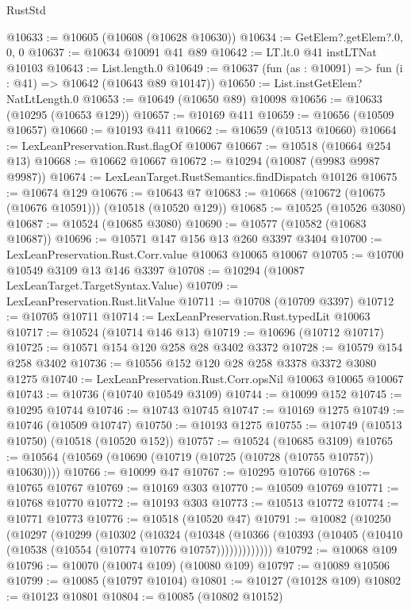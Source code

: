 \begin{lexlean}{RustStd}
\begin{coremodule}
@10633 := @10605 (@10608 (@10628 @10630))
@10634 := GetElem?.getElem?.{0, 0, 0}
@10637 := @10634 @10091 @41 @89
@10642 := LT.lt.{0} @41 instLTNat @10103
@10643 := List.length.{0}
@10649 := @10637 (fun (as : @10091) => fun (i : @41) => @10642 (@10643 @89 @10147))
@10650 := List.instGetElem?NatLtLength.{0}
@10653 := @10649 (@10650 @89) @10098
@10656 := @10633 (@10295 (@10653 @129))
@10657 := @10169 @411
@10659 := @10656 (@10509 @10657)
@10660 := @10193 @411
@10662 := @10659 (@10513 @10660)
@10664 := LexLeanPreservation.Rust.flagOf @10067
@10667 := @10518 (@10664 @254 @13)
@10668 := @10662 @10667
@10672 := @10294 (@10087 (@9983 @9987 @9987))
@10674 := LexLeanTarget.RustSemantics.findDispatch @10126
@10675 := @10674 @129
@10676 := @10643 @7
@10683 := @10668 (@10672 (@10675 (@10676 @10591))) (@10518 (@10520 @129))
@10685 := @10525 (@10526 @3080)
@10687 := @10524 (@10685 @3080)
@10690 := @10577 (@10582 (@10683 @10687))
@10696 := @10571 @147 @156 @13 @260 @3397 @3404
@10700 := LexLeanPreservation.Rust.Corr.value @10063 @10065 @10067
@10705 := @10700 @10549 @3109 @13 @146 @3397
@10708 := @10294 (@10087 LexLeanTarget.TargetSyntax.Value)
@10709 := LexLeanPreservation.Rust.litValue
@10711 := @10708 (@10709 @3397)
@10712 := @10705 @10711
@10714 := LexLeanPreservation.Rust.typedLit @10063
@10717 := @10524 (@10714 @146 @13)
@10719 := @10696 (@10712 @10717)
@10725 := @10571 @154 @120 @258 @28 @3402 @3372
@10728 := @10579 @154 @258 @3402
@10736 := @10556 @152 @120 @28 @258 @3378 @3372 @3080 @1275
@10740 := LexLeanPreservation.Rust.Corr.opsNil @10063 @10065 @10067
@10743 := @10736 (@10740 @10549 @3109)
@10744 := @10099 @152
@10745 := @10295 @10744
@10746 := @10743 @10745
@10747 := @10169 @1275
@10749 := @10746 (@10509 @10747)
@10750 := @10193 @1275
@10755 := @10749 (@10513 @10750) (@10518 (@10520 @152))
@10757 := @10524 (@10685 @3109)
@10765 := @10564 (@10569 (@10690 (@10719 (@10725 (@10728 (@10755 @10757)) @10630))))
@10766 := @10099 @47
@10767 := @10295 @10766
@10768 := @10765 @10767
@10769 := @10169 @303
@10770 := @10509 @10769
@10771 := @10768 @10770
@10772 := @10193 @303
@10773 := @10513 @10772
@10774 := @10771 @10773
@10776 := @10518 (@10520 @47)
@10791 := @10082
    (@10250
      (@10297
        (@10299
          (@10302
            (@10324
              (@10348
                (@10366 (@10393 (@10405 (@10410 (@10538 (@10554 (@10774 @10776 @10757)))))))))))))
@10792 := @10068 @109
@10796 := @10070 (@10074 @109) (@10080 @109)
@10797 := @10089 @10506
@10799 := @10085 (@10797 @10104)
@10801 := @10127 (@10128 @109)
@10802 := @10123 @10801
@10804 := @10085 (@10802 @10152)

\end{coremodule}
\end{lexlean}
